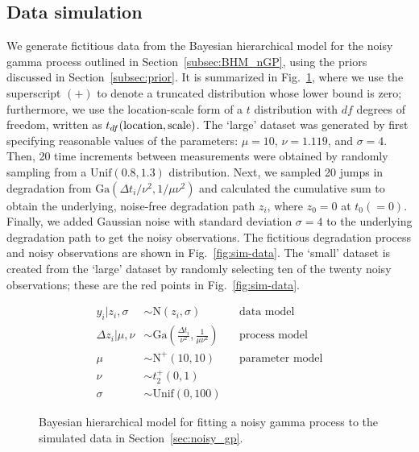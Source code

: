 \documentclass{article}
\begin{document}
\subsection{Data simulation}\label{subsec:datasim}
We generate fictitious data from the Bayesian hierarchical model for the noisy gamma process outlined in Section~\ref{subsec:BHM_nGP}, using the priors discussed in Section~\ref{subsec:prior}. It is summarized in Fig.~\ref{fig:BHM-nGP}, where we use the superscript $(+)$ to denote a truncated distribution whose lower bound is zero; furthermore, we use the location-scale form of a $t$ distribution with $df$ degrees of freedom, written as $t_{df}(\hbox{location}, \hbox{scale})$. The `large' dataset was generated by first specifying reasonable values of the parameters: $\mu = 10$, $\nu = 1.119$, and $\sigma = 4$. Then, 20 time increments between measurements were obtained by randomly sampling from a $\mbox{Unif}(0.8, 1.3)$ distribution. Next, we sampled 20 jumps in degradation from $\mbox{Ga}(\Delta t_i/\nu^2, 1/\mu\nu^2)$ and calculated the cumulative sum to obtain the underlying, noise-free degradation path $z_i$, where $z_0 = 0$ at $t_0 (=0)$. Finally, we added Gaussian noise with standard deviation $\sigma = 4$ to the underlying degradation path to get the noisy observations. The fictitious degradation process and noisy observations are shown in Fig.~\ref{fig:sim-data}. The `small' dataset is created from the `large' dataset by randomly selecting ten of the twenty noisy observations; these are the red points in Fig.~\ref{fig:sim-data}. 

\begin{figure}[t]
\begin{align*} 
    y_i|z_i, \sigma & \sim \mbox{N}(z_i, \sigma)  && \mbox{data model} \\
    \Delta z_i|\mu, \nu & \sim \mbox{Ga} \left( \frac{\Delta t_i}{\nu^2}, \frac{1}{\mu \nu^2} \right) && \mbox{process model} \\
    \mu & \sim \mbox{N}^{+}(10, 10) && \mbox{parameter model} \\
    \nu & \sim t_2^{+}(0, 1) \\
    \sigma & \sim \mbox{Unif}(0, 100) 
\end{align*}
\caption{Bayesian hierarchical model for fitting a noisy gamma process to the simulated data in Section~\ref{sec:noisy_gp}.}\label{fig:BHM-nGP}
\end{figure}
\end{document}
